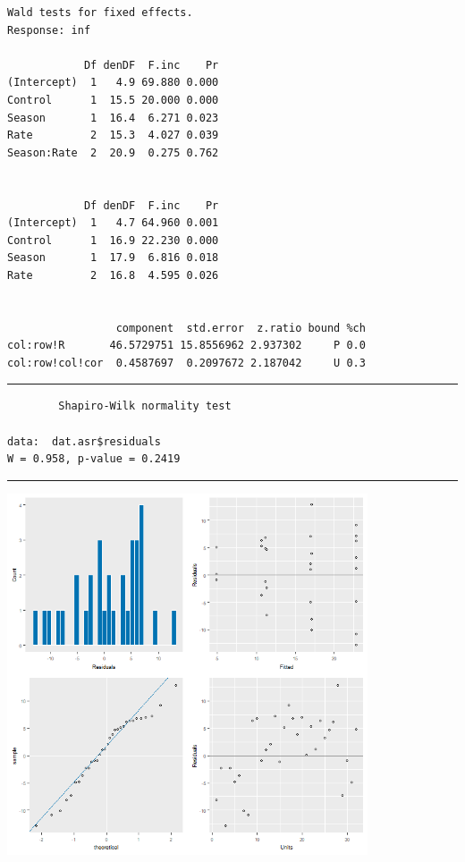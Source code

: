 \documentclass[a4paper, 10pt, fleqn, twosided]{memoir}
\begin{document}
\begin{tcolorbox}[title = Exercise 17 output]
\begin{verbatim}
Wald tests for fixed effects.
Response: inf

            Df denDF  F.inc    Pr
(Intercept)  1   4.9 69.880 0.000
Control      1  15.5 20.000 0.000
Season       1  16.4  6.271 0.023
Rate         2  15.3  4.027 0.039
Season:Rate  2  20.9  0.275 0.762


            Df denDF  F.inc    Pr
(Intercept)  1   4.7 64.960 0.001
Control      1  16.9 22.230 0.000
Season       1  17.9  6.816 0.018
Rate         2  16.8  4.595 0.026


                 component  std.error  z.ratio bound %ch
col:row!R       46.5729751 15.8556962 2.937302     P 0.0
col:row!col!cor  0.4587697  0.2097672 2.187042     U 0.3

\end{verbatim}
{\color{outpt} {\hrule height 1pt}}
\begin{verbatim}
        Shapiro-Wilk normality test

data:  dat.asr$residuals
W = 0.958, p-value = 0.2419

\end{verbatim}
{\color{outpt} {\hrule height 1pt}} \vspace{0.2cm}

\includegraphics[width=0.8\textwidth, frame]{Exercise17Resplot2.png}
\end{tcolorbox}
\end{document}
